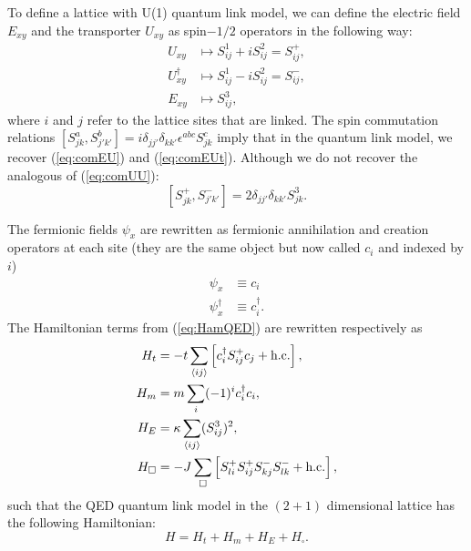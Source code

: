 \documentclass[a4paper]{report}
\begin{document}
\begin{spacing}{1.1}
To define a lattice with U(1) quantum link model, we can define the electric field $E_{xy}$ and the transporter $U_{xy}$ as spin$-1/2$ operators in the following way:
\begin{align}
    U_{xy} &\mapsto S_{ij}^1 + iS_{ij}^2 = S_{ij}^{+},\\
    U^\dagger_{xy} &\mapsto S_{ij}^1 - iS_{ij}^2 = S_{ij}^{-},\\
    E_{xy} &\mapsto S_{ij}^3,
\end{align}
where $i$ and $j$ refer to the lattice sites that are linked. The spin commutation relations $\left[ S_{jk}^a,S_{j'k'}^b \right] = i \delta_{jj'}\delta_{kk'}\epsilon^{abc}S^c_{jk}$ imply that in the quantum link model, we recover (\ref{eq:comEU}) and (\ref{eq:comEUt}). Although we do not recover the analogous of (\ref{eq:comUU}):
\begin{equation}
    \left[ S^{+}_{jk}, S^{-}_{j'k'}\right] = 2 \delta_{jj'}\delta_{kk'}S^3_{jk}.
\end{equation}

The fermionic fields $\psi_{x}$ are rewritten as fermionic annihilation and creation operators at each site (they are the same object but now called $c_i$ and indexed by $i$)
\begin{align}
    \psi_x &\equiv c_i \\
    \psi_x^\dagger &\equiv c^\dagger_i.
\end{align}
The Hamiltonian terms from (\ref{eq:HamQED}) are rewritten respectively as
\begin{align}
    H_t &= -t \sum_{\expval{ij}} \left[ c^\dagger_i S^+_{ij} c_j + \textnormal{h.c.} \right],\\
    H_m &= m \sum_i (-1)^i c^\dagger_i c_i,\\
    H_E &= \kappa \sum_{\expval{ij}} (S^3_{ij})^2,\\
    H_\square &= -J \sum_\square \left[ S^+_{li} S^+_{ij} S^-_{kj} S^-_{lk} + \textnormal{h.c.}\right],
\end{align}
such that the QED quantum link model in the $(2+1)$ dimensional lattice has the following Hamiltonian:
\begin{equation}\label{eq:HamLQED}
    H = H_t + H_m + H_E + H_\square. %
\end{equation}


\end{spacing}
\end{document}

